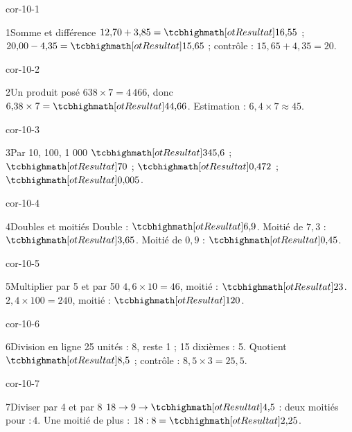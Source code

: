 \clearpage\pagestyle{otMain}\setlength{\otBlocEspacement}{2.5mm}\fontsize{11}{15}\selectfont{}
\begin{blocLivre}{cor-10-1}\begin{corrige}{1}{Somme et différence}
$12{,}70+3{,}85=\res{16{,}55}$ ; $20{,}00-4{,}35=\res{15{,}65}$ ; contrôle : $15{,}65+4{,}35=20$.
\end{corrige}\end{blocLivre}
\begin{blocLivre}{cor-10-2}\begin{corrige}{2}{Un produit posé}
$638\times7=4\,466$, donc $6{,}38\times7=\res{44{,}66}$. Estimation : $6{,}4\times7\approx45$.
\end{corrige}\end{blocLivre}
\begin{blocLivre}{cor-10-3}\begin{corrige}{3}{Par 10, 100, 1 000}
$\res{345{,}6}$ ; $\res{70}$ ; $\res{0{,}472}$ ; $\res{0{,}005}$.
\end{corrige}\end{blocLivre}
\begin{blocLivre}{cor-10-4}\begin{corrige}{4}{Doubles et moitiés}
Double : $\res{6{,}9}$. Moitié de $7{,}3$ : $\res{3{,}65}$. Moitié de $0{,}9$ : $\res{0{,}45}$.
\end{corrige}\end{blocLivre}
\begin{blocLivre}{cor-10-5}\begin{corrige}{5}{Multiplier par 5 et par 50}
$4{,}6\times10=46$, moitié : $\res{23}$. $2{,}4\times100=240$, moitié : $\res{120}$.
\end{corrige}\end{blocLivre}
\begin{blocLivre}{cor-10-6}\begin{corrige}{6}{Division en ligne}
25 unités : 8, reste 1 ; 15 dixièmes : 5. Quotient $\res{8{,}5}$ ; contrôle : $8{,}5\times3=25{,}5$.
\end{corrige}\end{blocLivre}
\begin{blocLivre}{cor-10-7}\begin{corrige}{7}{Diviser par 4 et par 8}
$18\to9\to\res{4{,}5}$ : deux moitiés pour $:4$. Une moitié de plus : $18:8=\res{2{,}25}$.
\end{corrige}\end{blocLivre}

